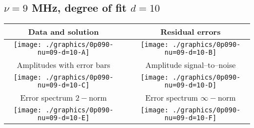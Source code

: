 

% 

\clearpage{}
\break{}

\subsection{$\nu = 9$ MHz, degree of fit $d = 10$}

\begin{table}[h]
    \begin{center}
        \begin{tabular}{ccc}
            Data and solution & \quad & Residual errors \\\hline
            \texttt{[image: ./graphics/0p090-nu=09-d=10-A]} &&
            \texttt{[image: ./graphics/0p090-nu=09-d=10-B]} \\[15pt]
            Amplitudes with error bars && Amplitude signal--to--noise \\\hline
            \texttt{[image: ./graphics/0p090-nu=09-d=10-C]} &&
            \texttt{[image: ./graphics/0p090-nu=09-d=10-D]} \\[15pt]
            Error spectrum $2-$norm && Error spectrum $\infty-$norm \\\hline
            \texttt{[image: ./graphics/0p090-nu=09-d=10-E]} &&
            \texttt{[image: ./graphics/0p090-nu=09-d=10-F]} \\[15pt]
        \end{tabular}
    \end{center}
\label{fig:elev=90, nu=9}
\end{table}



\endinput
